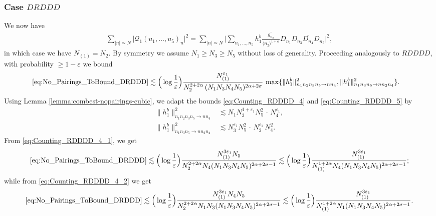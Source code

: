 \documentclass[11pt, xcolor = dvipsnames,reqno
]{amsart}
\theoremstyle{definition}
\theoremstyle{remark}
\begin{document}
\subsubsection{Case $DRDDD$}\label{subsec:drddd-nopairing}
We now have
\begin{align}\label{eq:No_Pairings_ToBound_DRDDD}
    \sum_{|n| \simeq N}  \big| \mathcal{Q}_1(u_1, \ldots, u_5)_n \big|^2
    = 
    \sum_{|n|\simeq N} \bigg| \sum_{n_1, \ldots, n_5 } h^b_1 \frac{\overline{g_{n_2}}}{\langle n_2 \rangle^{1+\alpha}} D_{n_1} D_{n_3} \overline{D_{n_4}} D_{n_5} \bigg|^2, 
\end{align}
in which case we have $N_{(1)} = N_2$. By symmetry we assume $N_1 \geq N_3 \geq N_5$ without loss of generality. 
Proceeding analogously to $RDDDD$, with probability $\geq 1 - \varepsilon$ we bound 
\begin{align*}
    \eqref{eq:No_Pairings_ToBound_DRDDD}
    &\lesssim \Big( \log \frac{1}{\varepsilon} \Big)
    \frac{N_{(1)}^{\varepsilon_1}}{N_2^{2+2\alpha} \, (N_1N_3N_4N_5)^{2\alpha + 2\sigma}} \, \max\{  \lVert  h^b_1 \rVert_{n_1n_2n_3n_5 \to nn_4}^2, \lVert  h^b_1 \rVert_{n_1n_3n_5 \to nn_2n_4}^2  \}. 
\end{align*}
Using Lemma \ref{lemma:combest-nopairings-cubic}, we adapt the bounds \eqref{eq:Counting_RDDDD_4} and \eqref{eq:Counting_RDDDD_5} by
\begin{align}
    \lVert  h^b_1 \rVert_{n_1n_2n_3n_5 \to nn_4}^2
    & \lesssim N_1 N_3^{1+{\varepsilon_1}} N_5^2 \, \cdot \, N_4^{\varepsilon_1},  \label{eq:Counting_RDDDD_4_1} \\
    \lVert  h^b_1 \rVert_{n_1n_3n_5 \to nn_2n_4}^2  
    &\lesssim N_3^{\varepsilon_1} N_5^2  \, \cdot \, N_2^{\varepsilon_1} \, N_4^2. \label{eq:Counting_RDDDD_4_2}
\end{align}
From \eqref{eq:Counting_RDDDD_4_1}, we get
\begin{align*}
    \eqref{eq:No_Pairings_ToBound_DRDDD}
    \lesssim 
    \Big( \log \frac{1}{\varepsilon} \Big)
    \frac{N_{(1)}^{3\varepsilon_1} N_5 }{N_2^{2 + 2\alpha} N_4 (N_1 N_3 N_4 N_5)^{2 \alpha + 2\sigma - 1} } \lesssim \Big( \log \frac{1}{\varepsilon} \Big)
    \frac{N_{(1)}^{3\varepsilon_1}  }{N_{(1)}^{1 + 2\alpha} N_4 (N_1 N_3 N_4 N_5)^{2 \alpha + 2\sigma - 1} };
\end{align*}
while from \eqref{eq:Counting_RDDDD_4_2} we get
\begin{align}\label{eq:No_Pairings_ToBound_RDDDD_int1} 
    \eqref{eq:No_Pairings_ToBound_DRDDD}
    \lesssim 
    \Big( \log \frac{1}{\varepsilon} \Big)
    \frac{N_{(1)}^{3\varepsilon_1} N_4 N_5 }{N_2^{2 + 2\alpha} N_1 N_3 (N_1 N_3 N_4 N_5)^{2 \alpha + 2\sigma - 1} } \lesssim \Big( \log \frac{1}{\varepsilon} \Big)
    \frac{N_{(1)}^{3\varepsilon_1} }{N_{(1)}^{1 + 2\alpha} N_1 (N_1 N_3 N_4 N_5)^{2 \alpha + 2\sigma - 1} }.
\end{align}
\end{document}
